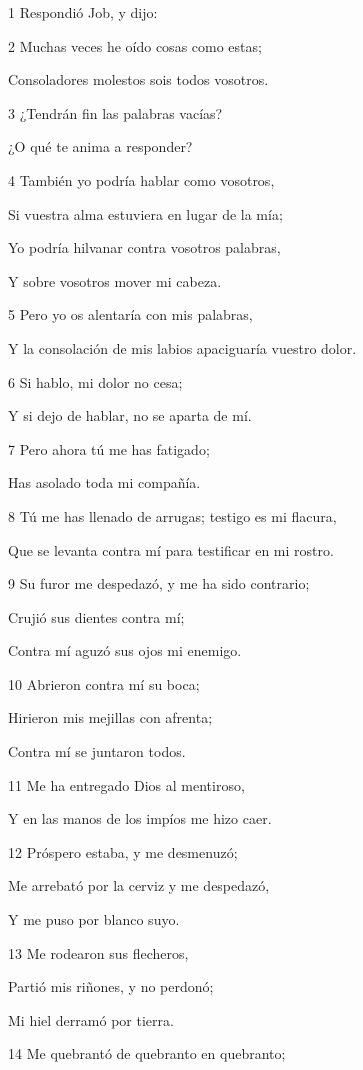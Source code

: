 \par 1 Respondió Job, y dijo:
\par 2 Muchas veces he oído cosas como estas;
\par Consoladores molestos sois todos vosotros.
\par 3 ¿Tendrán fin las palabras vacías?
\par ¿O qué te anima a responder?
\par 4 También yo podría hablar como vosotros,
\par Si vuestra alma estuviera en lugar de la mía;
\par Yo podría hilvanar contra vosotros palabras,
\par Y sobre vosotros mover mi cabeza.
\par 5 Pero yo os alentaría con mis palabras,
\par Y la consolación de mis labios apaciguaría vuestro dolor. 
\par 6 Si hablo, mi dolor no cesa;
\par Y si dejo de hablar, no se aparta de mí.
\par 7 Pero ahora tú me has fatigado;
\par Has asolado toda mi compañía.
\par 8 Tú me has llenado de arrugas; testigo es mi flacura,
\par Que se levanta contra mí para testificar en mi rostro.
\par 9 Su furor me despedazó, y me ha sido contrario;
\par Crujió sus dientes contra mí;
\par Contra mí aguzó sus ojos mi enemigo.
\par 10 Abrieron contra mí su boca;
\par Hirieron mis mejillas con afrenta;
\par Contra mí se juntaron todos.
\par 11 Me ha entregado Dios al mentiroso,
\par Y en las manos de los impíos me hizo caer.
\par 12 Próspero estaba, y me desmenuzó;
\par Me arrebató por la cerviz y me despedazó, 
\par Y me puso por blanco suyo.
\par 13 Me rodearon sus flecheros,
\par Partió mis riñones, y no perdonó;
\par Mi hiel derramó por tierra.
\par 14 Me quebrantó de quebranto en quebranto;
